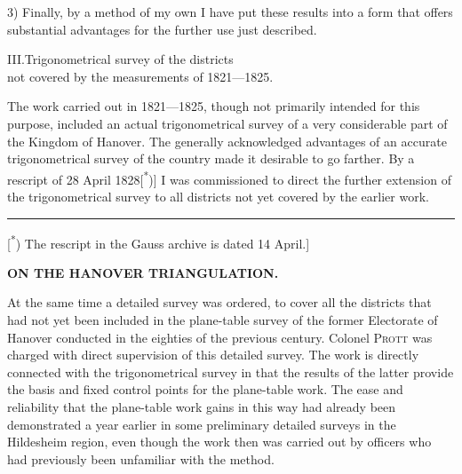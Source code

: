 \par\noindent\hspace*{\parindent}3) Finally, by a method of my own I have put these results into a form that offers substantial advantages for the further use just described.

\begin{center}
III.\quad Trigonometrical survey of the districts\\
not covered by the measurements of 1821---1825.
\end{center}

\par\noindent\hspace*{\parindent}The work carried out in 1821---1825, though not primarily intended for this purpose, included an actual trigonometrical survey of a very considerable part of the Kingdom of Hanover. The generally acknowledged advantages of an accurate trigonometrical survey of the country made it desirable to go farther. By a rescript of 28 April 1828[\textsuperscript{*})] I was commissioned to direct the further extension of the trigonometrical survey to all districts not yet covered by the earlier work.

\par\smallskip\noindent\rule{.24\linewidth}{.4pt}\par\smallskip
{\footnotesize\noindent\hspace*{\parindent}[\textsuperscript{*}) The rescript in the Gauss archive is dated 14 April.]\par}

\par\clearpage
\noindent\null\hfill{\small\textbf{ON THE HANOVER TRIANGULATION.}}\hfill{}\par\medskip

\par\noindent\hspace*{\parindent}At the same time a detailed survey was ordered, to cover all the districts that had not yet been included in the plane-table survey of the former Electorate of Hanover conducted in the eighties of the previous century. Colonel \textsc{Prott} was charged with direct supervision of this detailed survey. The work is directly connected with the trigonometrical survey in that the results of the latter provide the basis and fixed control points for the plane-table work. The ease and reliability that the plane-table work gains in this way had already been demonstrated a year earlier in some preliminary detailed surveys in the Hildesheim region, even though the work then was carried out by officers who had previously been unfamiliar with the method.

